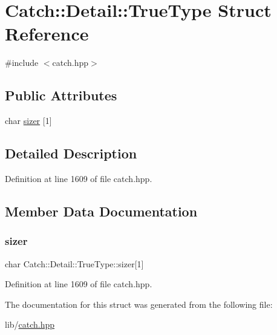 \hypertarget{struct_catch_1_1_detail_1_1_true_type}{}\section{Catch\+:\+:Detail\+:\+:True\+Type Struct Reference}
\label{struct_catch_1_1_detail_1_1_true_type}


{\ttfamily \#include $<$catch.\+hpp$>$}

\subsection*{Public Attributes}
\begin{DoxyCompactItemize}
\item 
char \hyperlink{struct_catch_1_1_detail_1_1_true_type_a3aaaeb75909e668b293c8a81f5fb6419}{sizer} \mbox{[}1\mbox{]}
\end{DoxyCompactItemize}


\subsection{Detailed Description}


Definition at line 1609 of file catch.\+hpp.



\subsection{Member Data Documentation}
\hypertarget{struct_catch_1_1_detail_1_1_true_type_a3aaaeb75909e668b293c8a81f5fb6419}{}\label{struct_catch_1_1_detail_1_1_true_type_a3aaaeb75909e668b293c8a81f5fb6419} 
\subsubsection{\texorpdfstring{sizer}{sizer}}
{\footnotesize\ttfamily char Catch\+::\+Detail\+::\+True\+Type\+::sizer\mbox{[}1\mbox{]}}



Definition at line 1609 of file catch.\+hpp.



The documentation for this struct was generated from the following file\+:\begin{DoxyCompactItemize}
\item 
lib/\hyperlink{catch_8hpp}{catch.\+hpp}\end{DoxyCompactItemize}
